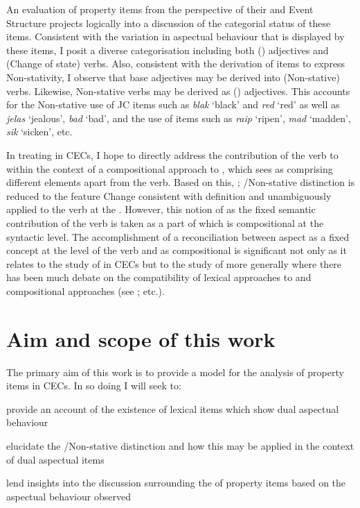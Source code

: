 An evaluation of property items from the perspective of their 
and Event Structure projects logically into a discussion of the categorial
status of these items.  Consistent with the variation in aspectual behaviour
that is displayed by these items, I posit a diverse categorisation including
both () adjectives and (Change of state) verbs.  Also, consistent with
the derivation of  items to express Non-stativity, I observe that base
adjectives may be derived into (Non-stative) verbs.  Likewise, Non-stative verbs
may be derived as () adjectives.  This accounts for the Non-stative use
of JC items such as \textit{blak} `black' and \textit{red} `red' as well as
\textit{jelas} `jealous', \textit{bad} `bad', and the  use of items such
as \textit{raip} `ripen', \textit{mad} `madden', \textit{sik} `sicken', etc.

In treating  in CECs, I hope to directly address the
contribution of the verb to  within the context of a compositional
approach to , which sees  as comprising different elements apart
from the verb.  Based on this, ; \slash Non-stative
distinction is reduced to the feature Change consistent with
 definition and unambiguously applied to the verb at the
.  However, this notion of  as the fixed semantic
contribution of the verb is taken as a part of  which is compositional at
the syntactic level.  The accomplishment of a reconciliation between aspect as a
fixed concept at the level of the verb and  as compositional is
significant not only as it relates to the study of  in CECs but to the
study of  more generally where there has been much debate on the
compatibility of lexical approaches to  and compositional approaches (see
\citealt{Rothstein2004,Tenny1994,Verkuyl1999}; etc.).

\section{Aim and scope of this work}\label{sec:1.8}

The primary aim of this work is to provide a model for the analysis of property
items in CECs.  In so doing I will seek to:

\ea\label{ex:1:10}
  \ea\parbox[t]{\linewidth}{provide an account of the existence of lexical items which show dual
  aspectual behaviour}
  \ex\parbox[t]{\linewidth}{elucidate the \slash Non-stative distinction and how this may be applied
  in the context of dual aspectual items}
  \ex\parbox[t]{\linewidth}{lend insights into the discussion surrounding the  of
  property items based on the aspectual behaviour observed}
  \z
\z

